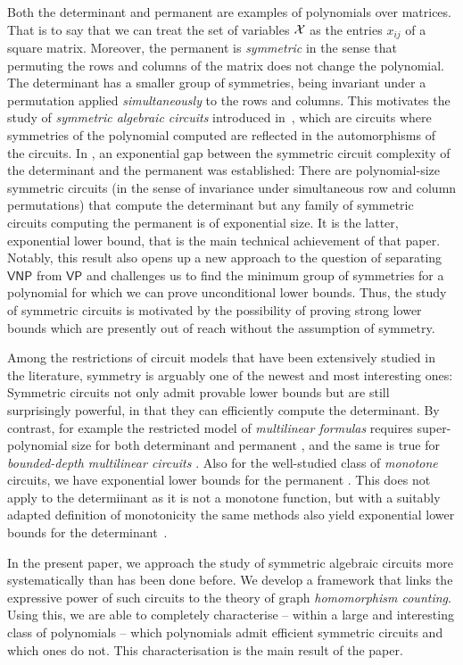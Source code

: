 \documentclass[11pt, DIV=15]{scrarticle}
\theoremstyle{definition}
\theoremstyle{plain}
\theoremstyle{remark}
\newcommand{\Xx}{{\cal X}}
\newcommand{\VP}{\mathsf{VP}}
\newcommand{\VNP}{\mathsf{VNP}}
\begin{document}
Both the determinant and permanent are examples of polynomials over matrices.  That is to say that we can treat the set of variables $\Xx$ as the entries $x_{ij}$ of a square matrix.  Moreover, the permanent is \emph{symmetric} in the sense that permuting the rows and columns of the matrix does not change the polynomial.  The determinant has a smaller group of symmetries, being invariant under a permutation applied \emph{simultaneously} to the rows and columns.  This motivates the study of \emph{symmetric algebraic circuits} introduced in~\cite{dawar_symmetric_2020,dawar_symmetric_2025}, which are circuits where symmetries of the polynomial computed are reflected in the automorphisms of the circuits.  
In \cite{dawar_symmetric_2020,dawar_symmetric_2025}, an exponential gap between the symmetric circuit complexity of the determinant and the permanent was established:
There are polynomial-size symmetric circuits (in the sense of
invariance under simultaneous row and column permutations) that
compute the determinant but any family of symmetric circuits computing
the permanent is of exponential size.  It is the latter, exponential
lower bound, that is the main technical achievement of that
paper. Notably, this result also opens up a new approach to the
question of separating $\VNP$ from $\VP$ and challenges us to find the minimum group of symmetries for a polynomial for which we can prove unconditional lower bounds.
Thus, the study of symmetric circuits is motivated by the possibility of proving strong lower bounds which are presently out of reach without the assumption of symmetry.

Among the restrictions of circuit models that have been extensively studied in the literature, symmetry is arguably one of the newest and most interesting ones: Symmetric circuits not only admit provable lower bounds but are still surprisingly powerful, in that they can efficiently compute the determinant. 
By contrast, for example the restricted model of \emph{multilinear
  formulas} requires super-polynomial size for both determinant and
permanent \cite{Raz04}, and the same is true for \emph{bounded-depth
  multilinear circuits} \cite{RazY08}. Also for the well-studied class
of \emph{monotone} circuits, we have exponential lower bounds for the
permanent \cite{JerrumS82}.  This does not apply to the determiinant
as it is not a monotone function, but with a suitably adapted
definition of monotonicity the same methods also yield exponential
lower bounds for the determinant~\cite{KayalS14}.

In the present paper, we approach the study of symmetric algebraic circuits more systematically than has been done before. We develop a framework that links the expressive power of such circuits to the theory of graph \emph{homomorphism counting}. Using this, we are able to completely characterise -- within a large and interesting class of polynomials -- which polynomials admit efficient symmetric circuits and which ones do not. This characterisation is the main result of the paper.
\end{document}
